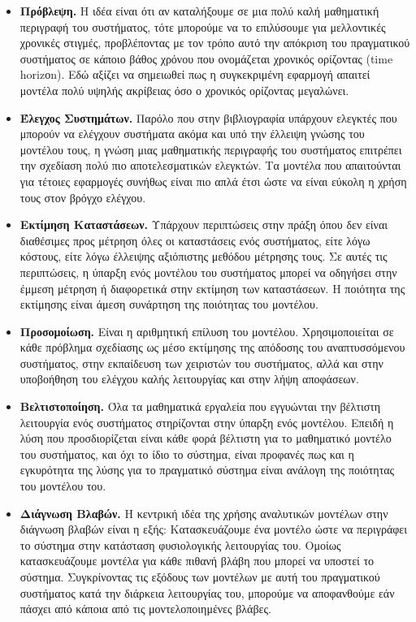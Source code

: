 \begin{itemize}
	\item
	{
		\textbf{Πρόβλεψη.} Η ιδέα είναι ότι αν καταλήξουμε σε μια πολύ καλή μαθηματική περιγραφή του συστήματος, τότε μπορούμε να το επιλύσουμε για μελλοντικές χρονικές στιγμές, προβλέποντας με τον τρόπο αυτό την απόκριση του πραγματικού συστήματος σε κάποιο βάθος χρόνου που ονομάζεται χρονικός ορίζοντας (time horizοn). Εδώ αξίζει να σημειωθεί πως η συγκεκριμένη εφαρμογή απαιτεί μοντέλα πολύ υψηλής ακρίβειας όσο ο χρονικός ορίζοντας μεγαλώνει.
		
	}
	
	\item 
	{
		\textbf{Έλεγχος Συστημάτων.} Παρόλο που στην βιβλιογραφία υπάρχουν ελεγκτές που μπορούν να ελέγχουν συστήματα ακόμα και υπό την έλλειψη γνώσης του μοντέλου τους, η γνώση μιας μαθηματικής περιγραφής του συστήματος επιτρέπει την σχεδίαση πολύ πιο αποτελεσματικών ελεγκτών. Τα μοντέλα που απαιτούνται για τέτοιες εφαρμογές συνήθως είναι πιο απλά έτσι ώστε να είναι εύκολη η χρήση τους στον βρόγχο ελέγχου.
	}
	
	\item 
	{
		\textbf{Εκτίμηση Καταστάσεων.} Υπάρχουν περιπτώσεις στην πράξη όπου δεν είναι διαθέσιμες προς μέτρηση όλες οι καταστάσεις ενός συστήματος, είτε λόγω κόστους, είτε λόγω έλλειψης αξιόπιστης μεθόδου μέτρησης τους. Σε αυτές τις περιπτώσεις, η ύπαρξη ενός μοντέλου του συστήματος μπορεί να οδηγήσει στην έμμεση μέτρηση ή διαφορετικά στην εκτίμηση των καταστάσεων. Η ποιότητα της εκτίμησης είναι άμεση συνάρτηση της ποιότητας του μοντέλου.
	}
	
	\item 
	{
		\textbf{Προσομοίωση.} Είναι η αριθμητική επίλυση του μοντέλου. Χρησιμοποιείται σε κάθε πρόβλημα σχεδίασης ως μέσο εκτίμησης της απόδοσης του αναπτυσσόμενου συστήματος, στην εκπαίδευση των χειριστών του συστήματος, αλλά και στην υποβοήθηση του ελέγχου καλής λειτουργίας και στην λήψη αποφάσεων.  
	}
	
	\item 
	{
		\textbf{Βελτιστοποίηση.} Όλα τα μαθηματικά εργαλεία που εγγυώνται την βέλτιστη λειτουργία ενός συστήματος στηρίζονται στην ύπαρξη ενός μοντέλου. Επειδή η λύση που προσδιορίζεται είναι κάθε φορά βέλτιστη για το μαθηματικό μοντέλο του συστήματος, και όχι το ίδιο το σύστημα, είναι προφανές πως και η εγκυρότητα της λύσης για το πραγματικό σύστημα είναι ανάλογη της ποιότητας του μοντέλου του.
	}
	
	\item 
	{
		\textbf{Διάγνωση Βλαβών.} Η κεντρική ιδέα της χρήσης αναλυτικών μοντέλων στην διάγνωση βλαβών είναι η εξής: Κατασκευάζουμε ένα μοντέλο ώστε να περιγράφει το σύστημα στην κατάσταση φυσιολογικής λειτουργίας του. Ομοίως κατασκευάζουμε μοντέλα για κάθε πιθανή βλάβη που μπορεί να υποστεί το σύστημα. Συγκρίνοντας τις εξόδους των μοντέλων με αυτή του πραγματικού συστήματος κατά την διάρκεια λειτουργίας του, μπορούμε να αποφανθούμε εάν πάσχει από κάποια από τις μοντελοποιημένες βλάβες.
	}
	
\end{itemize}


